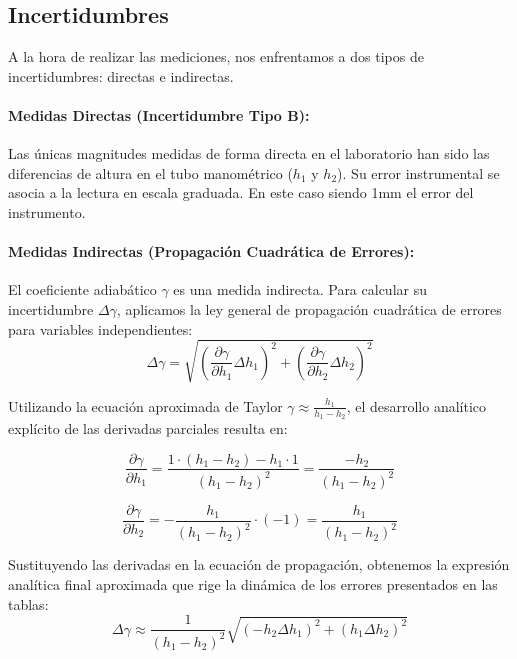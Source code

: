 \documentclass[11pt, a4paper]{article}
\begin{document}
\subsection{Incertidumbres}
\label{anexo:incertidumbres}
A la hora de realizar las mediciones, nos enfrentamos a dos tipos de incertidumbres: directas e indirectas.

\paragraph{Medidas Directas (Incertidumbre Tipo B):} 

Las únicas magnitudes medidas de forma directa en el laboratorio han sido las diferencias de altura en el tubo manométrico ($h_1$ y $h_2$). Su error instrumental se asocia a la lectura en escala graduada. En este caso siendo 1mm el error del instrumento.

\paragraph{Medidas Indirectas (Propagación Cuadrática de Errores):}
El coeficiente adiabático $\gamma$ es una medida indirecta. Para calcular su incertidumbre $\Delta\gamma$, aplicamos la ley general de propagación cuadrática de errores para variables independientes:
\begin{equation}
    \Delta \gamma = \sqrt{ \left( \frac{\partial \gamma}{\partial h_1} \Delta h_1 \right)^2 + \left( \frac{\partial \gamma}{\partial h_2} \Delta h_2 \right)^2 }
\end{equation}

Utilizando la ecuación aproximada de Taylor $\gamma \approx \frac{h_1}{h_1 - h_2}$, el desarrollo analítico explícito de las derivadas parciales resulta en:

\begin{equation}
    \frac{\partial \gamma}{\partial h_1} = \frac{1 \cdot (h_1 - h_2) - h_1 \cdot 1}{(h_1 - h_2)^2} = \frac{-h_2}{(h_1 - h_2)^2}
\end{equation}

\begin{equation}
    \frac{\partial \gamma}{\partial h_2} = - \frac{h_1}{(h_1 - h_2)^2} \cdot (-1) = \frac{h_1}{(h_1 - h_2)^2}
\end{equation}

Sustituyendo las derivadas en la ecuación de propagación, obtenemos la expresión analítica final aproximada que rige la dinámica de los errores presentados en las tablas:
\begin{equation}
    \Delta \gamma \approx \frac{1}{(h_1 - h_2)^2} \sqrt{ (-h_2 \Delta h_1)^2 + (h_1 \Delta h_2)^2 }
\end{equation}
\end{document}
